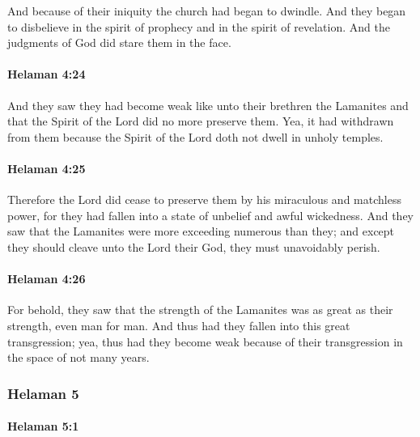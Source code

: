 			And because of their iniquity the church had began to dwindle.
			And they began to disbelieve in the spirit of prophecy
			and in the spirit of revelation.
			And the judgments of God did stare them in the face.

		\paragraph{Helaman 4:24} %
			\label{HELAMAN-4-24}

			And they saw they had become weak like unto their brethren the Lamanites
			and that the Spirit of the Lord did no more preserve them.
			Yea, it had withdrawn from them
			because the Spirit of the Lord doth not dwell in unholy temples.

		\paragraph{Helaman 4:25} %
			\label{HELAMAN-4-25}

			Therefore the Lord did cease to preserve them
			by his miraculous and matchless power,
			for they had fallen into a state of unbelief and awful wickedness.
			And they saw that the Lamanites were more exceeding numerous than they;
			and except they should cleave unto the Lord their God,
			they must unavoidably perish.

		\paragraph{Helaman 4:26} %
			\label{HELAMAN-4-26}

			For behold, they saw that the strength of the Lamanites
			was as great as their strength, even man for man.
			And thus had they fallen into this great transgression;
			yea, thus had they become weak because of their transgression
			in the space of not many years.

	\subsubsection{Helaman 5} %
		\label{HELAMAN-5}
		
		\paragraph{Helaman 5:1} %
			\label{HELAMAN-5-1}


